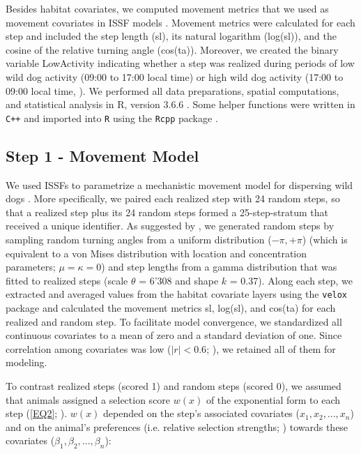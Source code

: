 \documentclass[abstract=on,10pt,a4paper,bibliography=totocnumbered]{article}
\begin{document}
Besides habitat covariates, we computed movement metrics that we used as
movement covariates in ISSF models \citep{Avgar.2016, Fieberg.2021}. Movement
metrics were calculated for each step and included the step length
(\textsf{sl}), its natural logarithm (\textsf{log(sl)}), and the cosine of the
relative turning angle (\textsf{cos(ta)}). Moreover, we created the binary
variable \textsf{LowActivity} indicating whether a step was realized during
periods of low wild dog activity (09:00 to 17:00 local time) or high wild dog
activity (17:00 to 09:00 local time, \citealp{Cozzi.2012}). We performed all
data preparations, spatial computations, and statistical analysis in R, version
3.6.6 \citep{R.2020}. Some helper functions were written in {\tt C++} and
imported into {\tt R} using the {\tt Rcpp} package \citep{Eddelbuettel.2011,
Eddelbuettel.2013}.

\subsection{Step 1 - Movement Model}
We used ISSFs to parametrize a mechanistic movement model for dispersing wild
dogs \citep{Avgar.2016}. More specifically, we paired each realized step with 24
random steps, so that a realized step plus its 24 random steps formed a
25-step-stratum that received a unique identifier. As suggested by
\cite{Avgar.2016}, we generated random steps by sampling random turning angles
from a uniform distribution (\(-\pi, +\pi\)) (which is equivalent to a von Mises
distribution with location and concentration parameters; \(\mu = \kappa = 0\))
and step lengths from a gamma distribution that was fitted to realized steps
(scale \(\theta\) = 6'308 and shape \(k\) = 0.37). Along each step, we extracted
and averaged values from the habitat covariate layers using the {\tt velox}
package \citep{Hunziker.2021} and calculated the movement metrics \textsf{sl},
\textsf{log(sl)}, and \textsf{cos(ta)} for each realized and random step. To
facilitate model convergence, we standardized all continuous covariates to a
mean of zero and a standard deviation of one. Since correlation among covariates
was low (\(|r| < 0.6\); \citealp{Latham.2011}), we retained all of them for
modeling.

To contrast realized steps (scored 1) and random steps (scored 0), we assumed
that animals assigned a selection score \(w(x)\) of the exponential form to each
step (\ref{EQ2}; \citealp{Fortin.2005}). \(w(x)\) depended on the step's
associated covariates (\(x_1, x_2, ..., x_n\)) and on the animal's preferences
(i.e. relative selection strengths; \citealp{Avgar.2017}) towards these
covariates (\(\beta_1, \beta_2, ..., \beta_n\)):
\end{document}

